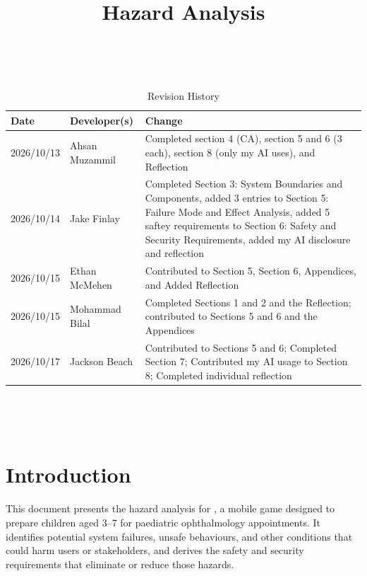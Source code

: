 \documentclass{article}
\title{Hazard Analysis\\\progname}
\author{\authname}
\date{}
\newcounter{hazard}
\begin{document}
\maketitle
\thispagestyle{empty}

~\newpage


\begin{table}[hp]
\caption{Revision History} \label{TblRevisionHistory}
\begin{tabularx}{\textwidth}{llX}
\toprule
\textbf{Date} & \textbf{Developer(s)} & \textbf{Change}\\
\midrule
2026/10/13 & Ahsan Muzammil & Completed section 4 (CA), section 5 and 6 (3 each), section 8 (only my AI uses), and Reflection\\
2026/10/14 & Jake Finlay & Completed Section 3: System Boundaries and
Components, added 3 entries to Section 5: Failure Mode and Effect Analysis,
added 5 saftey requirements to Section 6: Safety and Security Requirements,
added my AI disclosure and reflection \\
2026/10/15 & Ethan McMehen & Contributed to Section 5, Section 6, Appendices, and Added Reflection \\
2026/10/15 & Mohammad Bilal & Completed Sections 1 and 2 and the Reflection; contributed to Sections 5 and 6 and the Appendices \\
2026/10/17 & Jackson Beach & Contributed to Sections 5 and 6; Completed Section 7; Contributed my AI usage to Section 8; Completed individual reflection \\
\bottomrule
\end{tabularx}
\end{table}

~\newpage

\tableofcontents

~\newpage


\section{Introduction}
\label{sec_Introduction}

This document presents the hazard analysis for \progname{}, a mobile game
designed to prepare children aged 3--7 for paediatric ophthalmology appointments.
It identifies potential system failures, unsafe behaviours, and other
conditions that could harm users or stakeholders,
and derives the safety and security requirements that eliminate or
reduce those hazards.
\end{document}

